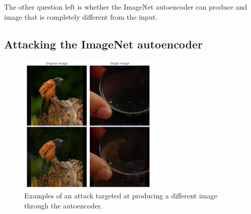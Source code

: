 \documentclass[]{scrarticle}
\begin{document}
The other question left is whether the ImageNet autoencoder can produce
and image that is completely different from the input.

\subsection{Attacking the ImageNet autoencoder}

\begin{figure}[h]
  \centering
  \includegraphics[width=0.6\textwidth]{images/ae_targeted_attack_example.png}
  \caption{
    Examples of an attack targeted at producing a different image
    through the autoencoder.
  }
  \label{fig:ae_targeted_attack_example}
\end{figure}
\end{document}
